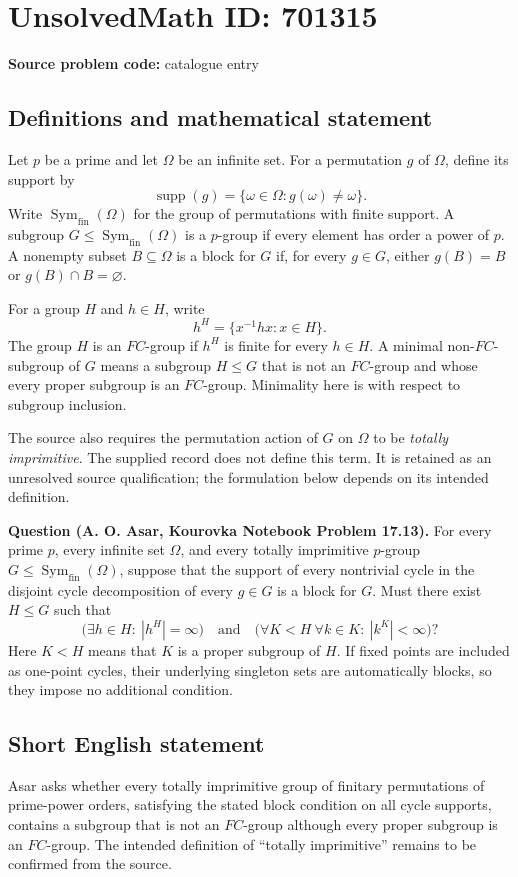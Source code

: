 \documentclass[11pt]{article}
\begin{document}
\section*{UnsolvedMath ID: 701315}
\textbf{Source problem code:} catalogue entry
\subsection{Definitions and mathematical statement}
Let \(p\) be a prime and let \(\Omega\) be an infinite set. For a permutation \(g\) of \(\Omega\), define its support by
\[
\operatorname{supp}(g)=\{\omega\in\Omega:g(\omega)\ne\omega\}.
\]
Write \(\operatorname{Sym}_{\mathrm{fin}}(\Omega)\) for the group of permutations with finite support. A subgroup \(G\leq\operatorname{Sym}_{\mathrm{fin}}(\Omega)\) is a \(p\)-group if every element has order a power of \(p\). A nonempty subset \(B\subseteq\Omega\) is a block for \(G\) if, for every \(g\in G\), either \(g(B)=B\) or \(g(B)\cap B=\varnothing\).

For a group \(H\) and \(h\in H\), write
\[
h^H=\{x^{-1}hx:x\in H\}.
\]
The group \(H\) is an \(FC\)-group if \(h^H\) is finite for every \(h\in H\). A minimal non-\(FC\)-subgroup of \(G\) means a subgroup \(H\leq G\) that is not an \(FC\)-group and whose every proper subgroup is an \(FC\)-group. Minimality here is with respect to subgroup inclusion.

The source also requires the permutation action of \(G\) on \(\Omega\) to be \emph{totally imprimitive}. The supplied record does not define this term. It is retained as an unresolved source qualification; the formulation below depends on its intended definition.

\textbf{Question (A. O. Asar, Kourovka Notebook Problem 17.13).} For every prime \(p\), every infinite set \(\Omega\), and every totally imprimitive \(p\)-group \(G\leq\operatorname{Sym}_{\mathrm{fin}}(\Omega)\), suppose that the support of every nontrivial cycle in the disjoint cycle decomposition of every \(g\in G\) is a block for \(G\). Must there exist \(H\leq G\) such that
\[
\bigl(\exists h\in H:\ |h^H|=\infty\bigr)
\quad\text{and}\quad
\bigl(\forall K<H\ \forall k\in K:\ |k^K|<\infty\bigr)?
\]
Here \(K<H\) means that \(K\) is a proper subgroup of \(H\). If fixed points are included as one-point cycles, their underlying singleton sets are automatically blocks, so they impose no additional condition.
\subsection{Short English statement}
Asar asks whether every totally imprimitive group of finitary permutations of prime-power orders, satisfying the stated block condition on all cycle supports, contains a subgroup that is not an \(FC\)-group although every proper subgroup is an \(FC\)-group. The intended definition of ``totally imprimitive'' remains to be confirmed from the source.
\end{document}
